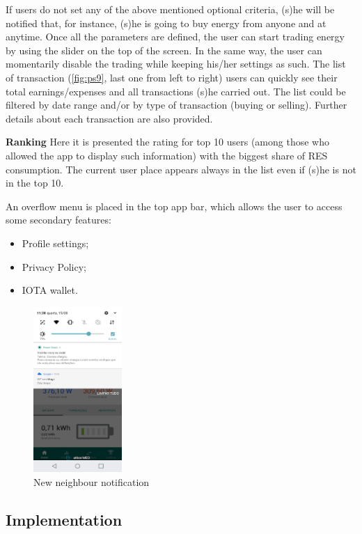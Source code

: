 If users do not set any of the above mentioned optional criteria, (s)he will be notified that, for instance, (s)he is going to buy energy from anyone and at anytime. Once all the parameters are defined, the user can start trading energy by using the slider on the top of the screen. In the same way, the user can momentarily disable the trading while keeping his/her settings as such.
The list of transaction (\cref{fig:ps9}, last one from left to right) users can quickly see their total earnings/expenses and all transactions (s)he carried out.  The list could be filtered by date range and/or by type of transaction (buying or selling). Further details about each transaction are also provided.  



\textbf{Ranking}
Here it is presented the rating for top 10 users (among those who allowed the app to display such information) with the biggest share of RES consumption. The current user place appears always in the list even if (s)he is not in the top 10.

An overflow menu is placed in the top app bar, which allows the user to access some secondary features:
\begin{itemize}
    \item Profile settings;
    \item Privacy Policy;
    \item IOTA wallet.
\end{itemize}


\begin{figure}[h]
\centering
\includegraphics[width=0.3\textwidth]{./Images/ps10}
\caption{New neighbour notification}
\label{fig:ps10}
\end{figure}

\subsection{Implementation}

